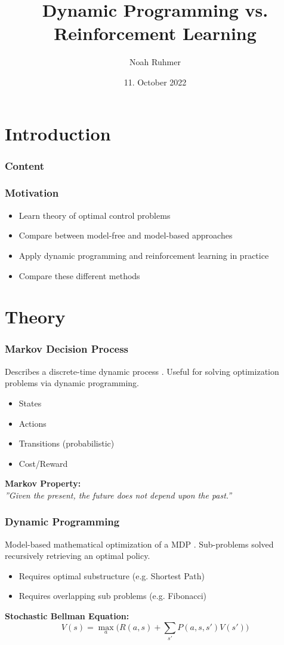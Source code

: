 \documentclass{beamer}
\title[test]{\textbf{Dynamic Programming vs. Reinforcement Learning}}
\author{Noah Ruhmer}
\date{11. October 2022}
\begin{document}
\titleframe
\section{Introduction}

\begin{frame}
  \frametitle{Content}
  \tableofcontents%
  \note{
  	
  }
\end{frame}

\begin{frame}
	\frametitle{Motivation}
	\begin{itemize}
		\item Learn theory of optimal control problems
		\item Compare between model-free and model-based approaches
		\item Apply dynamic programming and reinforcement learning in practice
		\item Compare these different methods
	\end{itemize}
	
\end{frame}

\section{Theory}
\begin{frame}
	\frametitle{Markov Decision Process}
	Describes a discrete-time dynamic process \cite{bellman1957markovian}. Useful for solving optimization problems via dynamic programming.
	\begin{itemize}
		\item States
		\item Actions
		\item Transitions (probabilistic)
		\item Cost/Reward
	\end{itemize}
	\textbf{Markov Property:}\\
	\textit{''Given the present, the future does not depend upon the past.''}
\end{frame}

\begin{frame}
	\frametitle{Dynamic Programming}
	Model-based mathematical optimization of a MDP \cite{bellman1966dynamic}. Sub-problems solved recursively retrieving an optimal policy.
	
	\begin{itemize}
		\item Requires optimal substructure (e.g. Shortest Path)
		\item Requires overlapping sub problems (e.g. Fibonacci)
	\end{itemize}
	\textbf{Stochastic Bellman Equation:}
	\begin{equation*}
	\label{eqn:sto_bellman}
	V(s) = \max_a \bigg(R(a, s) + \sum_{s'} P(a, s, s') V(s')\bigg)
	\end{equation*}

\end{frame}
\end{document}
